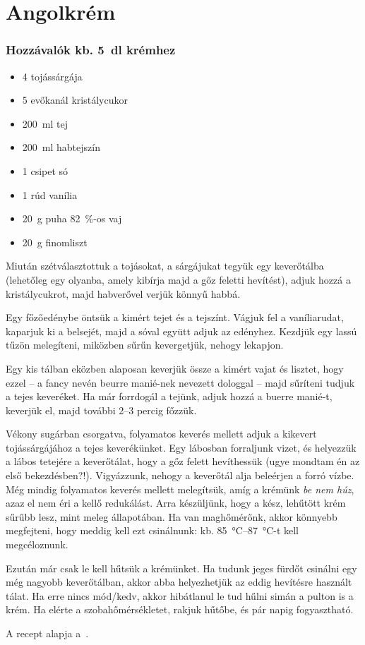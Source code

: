 \newpage
\section{Angolkrém} \label{sec:angolkem}

\subsubsection*{Hozzávalók kb. \qty{5}{\deci\l} krémhez}
\begin{itemize}
    \item \num{4} tojássárgája
    \item \num{5} evőkanál kristálycukor
    \item \qty{200}{\ml} tej
    \item \qty{200}{\ml} habtejszín
    \item \num{1} csipet só
    \item \num{1} rúd vanília
    \item \qty{20}{\g} puha \qty{82}{\percent}-os vaj
    \item \qty{20}{\g} finomliszt
\end{itemize}

Miután szétválasztottuk a tojásokat, a sárgájukat tegyük egy keverőtálba (lehetőleg egy olyanba, amely kibírja majd a gőz feletti hevítést), adjuk hozzá a kristálycukrot, majd habverővel verjük könnyű habbá.

Egy főzőedénybe öntsük a kimért tejet és a tejszínt. Vágjuk fel a vaníliarudat, kaparjuk ki a belsejét, majd a sóval együtt adjuk az edényhez. Kezdjük egy lassú tűzön melegíteni, miközben sűrűn kevergetjük, nehogy lekapjon.

Egy kis tálban eközben alaposan keverjük össze a kimért vajat és lisztet, hogy ezzel -- a fancy nevén beurre manié-nek nevezett dologgal -- majd sűríteni tudjuk a tejes keveréket. Ha már forrdogál a tejünk, adjuk hozzá a buerre manié-t, keverjük el, majd további \numrange{2}{3} percig főzzük.

Vékony sugárban csorgatva, folyamatos keverés mellett adjuk a kikevert tojássárgájához a tejes keverékünket. Egy lábosban forraljunk vizet, és helyezzük a lábos tetejére a keverőtálat, hogy a gőz felett hevíthessük (ugye mondtam én az első bekezdésben?!). Vigyázzunk, nehogy a keverőtál alja beleérjen a forró vízbe. Még mindig folyamatos keverés mellett melegítsük, amíg a krémünk \emph{be nem húz}, azaz el nem éri a kellő redukálást. Arra készüljünk, hogy a kész, lehűtött krém sűrűbb lesz, mint meleg állapotában. Ha van maghőmérőnk, akkor könnyebb megfejteni, hogy meddig kell ezt csinálnunk: kb. \qtyrange{85}{87}{\celsius}-t kell megcéloznunk.

Ezután már csak le kell hűtsük a krémünket. Ha tudunk jeges fürdőt csinálni egy még nagyobb keverőtálban, akkor abba helyezhetjük az eddig hevítésre használt tálat. Ha erre nincs mód/kedv, akkor hibátlanul le tud hűlni simán a pulton is a krém. Ha elérte a szobahőmérsékletet, rakjuk hűtőbe, és pár napig fogyasztható.


A recept alapja a~\cite{szell_angolkrem}.
